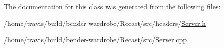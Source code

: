 The documentation for this class was generated from the following files\-:\begin{DoxyCompactItemize}
\item 
/home/travis/build/bender-\/wardrobe/\-Recast/src/headers/\hyperlink{_server_8h}{Server.\-h}\item 
/home/travis/build/bender-\/wardrobe/\-Recast/src/\hyperlink{_server_8cpp}{Server.\-cpp}\end{DoxyCompactItemize}
